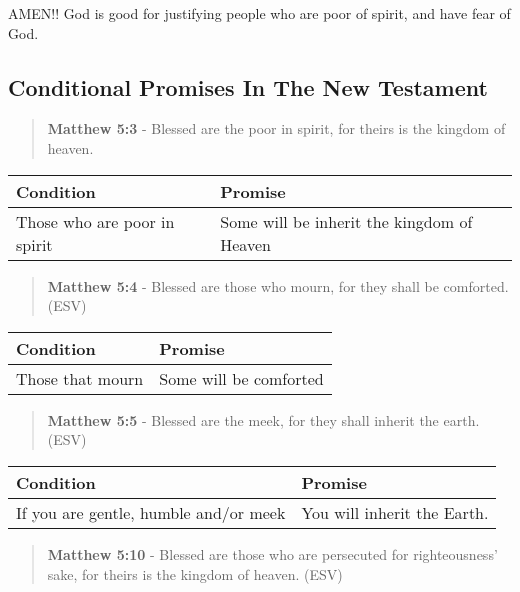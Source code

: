 \documentclass[11pt]{article}
\begin{document}
AMEN!! God is good for justifying people who are poor of spirit, and have fear of God.

\subsection{Conditional Promises In The New Testament}
\label{sec:org4389232}
\begin{quote}
\textbf{Matthew 5:3} - Blessed are the poor in spirit, for theirs is the kingdom of heaven.
\end{quote}

\begin{center}
\begin{tabular}{ll}
Condition & Promise\\[0pt]
\hline
Those who are poor in spirit & Some will be inherit the kingdom of Heaven\\[0pt]
\end{tabular}
\end{center}

\begin{quote}
\textbf{Matthew 5:4} - Blessed are those who mourn, for they shall be comforted. (ESV)
\end{quote}

\begin{center}
\begin{tabular}{ll}
Condition & Promise\\[0pt]
\hline
Those that mourn & Some will be comforted\\[0pt]
\end{tabular}
\end{center}

\begin{quote}
\textbf{Matthew 5:5} - Blessed are the meek, for they shall inherit the earth. (ESV)
\end{quote}

\begin{center}
\begin{tabular}{ll}
Condition & Promise\\[0pt]
\hline
If you are gentle, humble and/or meek & You will inherit the Earth.\\[0pt]
\end{tabular}
\end{center}

\begin{quote}
\textbf{Matthew 5:10} - Blessed are those who are persecuted for righteousness' sake, for theirs is the kingdom of heaven. (ESV)
\end{quote}
\end{document}
